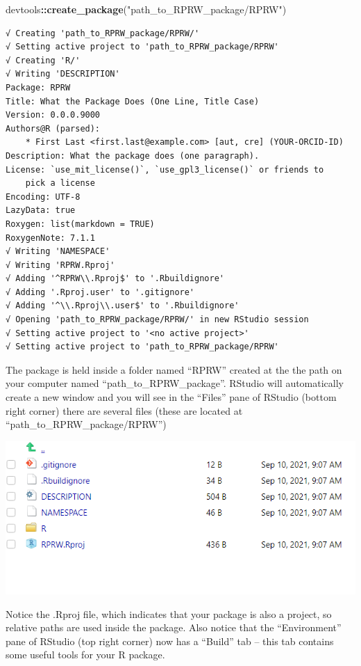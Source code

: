 \documentclass[
]{book}
\newenvironment{Shaded}{\begin{snugshade}}{\end{snugshade}}
\newcommand{\KeywordTok}[1]{\textcolor[rgb]{0.13,0.29,0.53}{\textbf{#1}}}
\newcommand{\NormalTok}[1]{#1}
\newcommand{\OperatorTok}[1]{\textcolor[rgb]{0.81,0.36,0.00}{\textbf{#1}}}
\newcommand{\StringTok}[1]{\textcolor[rgb]{0.31,0.60,0.02}{#1}}
\begin{document}
\begin{Shaded}
\begin{Highlighting}[]
\NormalTok{devtools}\OperatorTok{::}\KeywordTok{create_package}\NormalTok{(}\StringTok{"path_to_RPRW_package/RPRW"}\NormalTok{)}
\end{Highlighting}
\end{Shaded}

\begin{verbatim}
√ Creating 'path_to_RPRW_package/RPRW/'
√ Setting active project to 'path_to_RPRW_package/RPRW'
√ Creating 'R/'
√ Writing 'DESCRIPTION'
Package: RPRW
Title: What the Package Does (One Line, Title Case)
Version: 0.0.0.9000
Authors@R (parsed):
    * First Last <first.last@example.com> [aut, cre] (YOUR-ORCID-ID)
Description: What the package does (one paragraph).
License: `use_mit_license()`, `use_gpl3_license()` or friends to
    pick a license
Encoding: UTF-8
LazyData: true
Roxygen: list(markdown = TRUE)
RoxygenNote: 7.1.1
√ Writing 'NAMESPACE'
√ Writing 'RPRW.Rproj'
√ Adding '^RPRW\\.Rproj$' to '.Rbuildignore'
√ Adding '.Rproj.user' to '.gitignore'
√ Adding '^\\.Rproj\\.user$' to '.Rbuildignore'
√ Opening 'path_to_RPRW_package/RPRW/' in new RStudio session
√ Setting active project to '<no active project>'
√ Setting active project to 'path_to_RPRW_package/RPRW'
\end{verbatim}

The package is held inside a folder named ``RPRW'' created at the the path on your computer named ``path\_to\_RPRW\_package''. RStudio will automatically create a new window and you will see in the ``Files'' pane of RStudio (bottom right corner) there are several files (these are located at ``path\_to\_RPRW\_package/RPRW'')

\includegraphics[width=1\linewidth]{images/newrpack_files}

Notice the .Rproj file, which indicates that your package is also a project, so relative paths are used inside the package. Also notice that the ``Environment'' pane of RStudio (top right corner) now has a ``Build'' tab -- this tab contains some useful tools for your R package.
\end{document}
